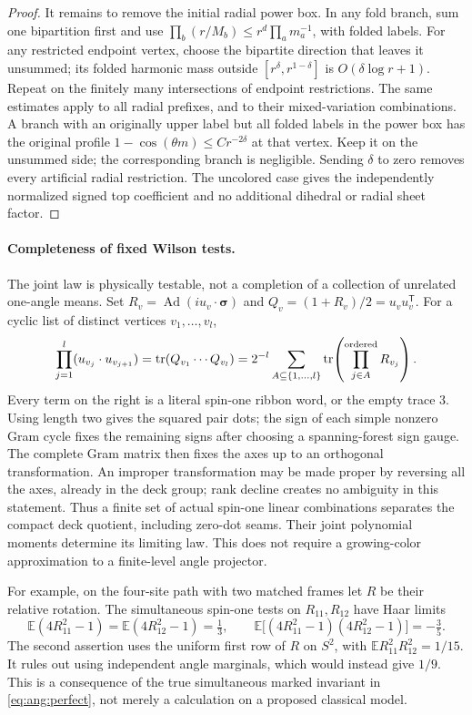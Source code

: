 \begin{proof}
It remains to remove the initial radial power box. In any fold branch, sum one bipartition first and use \(\prod_b(r/M_b)\leq r^d\prod_a m_a^{-1}\), with folded labels. For any restricted endpoint vertex, choose the bipartite direction that leaves it unsummed; its folded harmonic mass outside \([r^\delta,r^{1-\delta}]\) is \(O(\delta\log r+1)\). Repeat on the finitely many intersections of endpoint restrictions. The same estimates apply to all radial prefixes, and to their mixed-variation combinations. A branch with an originally upper label but all folded labels in the power box has the original profile \(1-\cos(\theta m)\leq C r^{-2\delta}\) at that vertex. Keep it on the unsummed side; the corresponding branch is negligible. Sending \(\delta\) to zero removes every artificial radial restriction. The uncolored case gives the independently normalized signed top coefficient and no additional dihedral or radial sheet factor.
\end{proof}

\paragraph{Completeness of fixed Wilson tests.}
The joint law is physically testable, not a completion of a collection of unrelated one-angle means. Set \(R_v=\operatorname{Ad}(i u_v\cdot\boldsymbol{\sigma})\) and \(Q_v=(1+R_v)/2=u_vu_v^{\mathsf T}\). For a cyclic list of distinct vertices \(v_1,\ldots,v_l\),
\[
 \prod_{j=1}^l(u_{v_j}\cdot u_{v_{j+1}})
   =\operatorname{tr}(Q_{v_1}\cdots Q_{v_l})
   =2^{-l}\sum_{A\subseteq\{1,\ldots,l\}}
                      \operatorname{tr}\!\left(\prod_{j\in A}^{\rm ordered}R_{v_j}\right).
\]
Every term on the right is a literal spin-one ribbon word, or the empty trace \(3\). Using length two gives the squared pair dots; the sign of each simple nonzero Gram cycle fixes the remaining signs after choosing a spanning-forest sign gauge. The complete Gram matrix then fixes the axes up to an orthogonal transformation. An improper transformation may be made proper by reversing all the axes, already in the deck group; rank decline creates no ambiguity in this statement. Thus a finite set of actual spin-one linear combinations separates the compact deck quotient, including zero-dot seams. Their joint polynomial moments determine its limiting law. This does not require a growing-color approximation to a finite-level angle projector.

For example, on the four-site path with two matched frames let \(R\) be their relative rotation. The simultaneous spin-one tests on \(R_{11},R_{12}\) have Haar limits
\[
       \mathbb E(4R_{11}^2-1)=\mathbb E(4R_{12}^2-1)=\tfrac13,\qquad
       \mathbb E\bigl[(4R_{11}^2-1)(4R_{12}^2-1)\bigr]=-\tfrac35 .
\]
The second assertion uses the uniform first row of \(R\) on \(S^2\), with \(\mathbb E R_{11}^2R_{12}^2=1/15\). It rules out using independent angle marginals, which would instead give \(1/9\). This is a consequence of the true simultaneous marked invariant in \eqref{eq:ang:perfect}, not merely a calculation on a proposed classical model.
